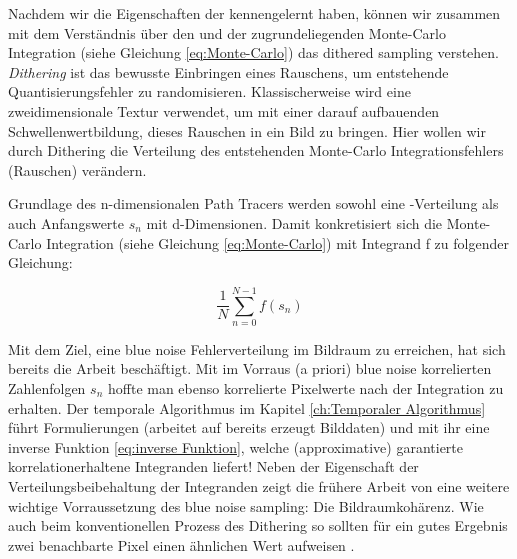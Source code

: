 \label{subsec:dither sampling}
Nachdem wir die Eigenschaften der  kennengelernt haben,
können wir zusammen mit dem Verständnis über den  und der 
zugrundeliegenden Monte-Carlo Integration (siehe Gleichung \ref{eq:Monte-Carlo}) das \glqq dithered sampling\grqq{} verstehen.
\textit{Dithering} ist das bewusste Einbringen eines Rauschens, um entstehende Quantisierungsfehler zu randomisieren.
Klassischerweise wird eine zweidimensionale  Textur verwendet, um mit einer darauf aufbauenden Schwellenwertbildung,
dieses Rauschen in ein Bild zu bringen. Hier wollen wir durch Dithering die Verteilung des entstehenden Monte-Carlo Integrationsfehlers (Rauschen) verändern.\par
Grundlage des n-dimensionalen Path Tracers werden sowohl eine -Verteilung als auch Anfangswerte $s_{n}$ mit d-Dimensionen.
Damit konkretisiert sich die Monte-Carlo Integration (siehe Gleichung \ref{eq:Monte-Carlo}) mit Integrand f zu folgender Gleichung:

\begin{tcolorbox}[rightrule=3mm, rounded corners=east]
    \begin{equation}\label{eq:concreteMonteCarlo}
        \frac{1}{N}\sum_{n=0}^{N-1}f(s_{n})
    \end{equation}
\end{tcolorbox}


Mit dem Ziel, eine blue noise Fehlerverteilung im Bildraum zu erreichen, hat sich bereits die Arbeit \cite{georgiev2016blue} beschäftigt. 
Mit im Vorraus (\glqq a priori\grqq{}) blue noise korrelierten Zahlenfolgen $s_{n}$ hoffte man ebenso korrelierte Pixelwerte nach 
der Integration zu erhalten. Der temporale Algorithmus im Kapitel \ref{ch:Temporaler Algorithmus} führt 
Formulierungen (arbeitet auf bereits erzeugt Bilddaten) und mit ihr eine inverse Funktion \ref{eq:inverse Funktion}, welche (approximative) garantierte
korrelationerhaltene Integranden liefert! Neben der Eigenschaft der Verteilungsbeibehaltung der Integranden zeigt die frühere Arbeit von \cite[Seite 3]{hal02158423}
eine weitere wichtige Vorraussetzung des blue noise sampling: Die Bildraumkohärenz. Wie auch beim konventionellen Prozess des Dithering so sollten für ein gutes
Ergebnis zwei benachbarte Pixel einen ähnlichen Wert aufweisen \cite{3288}.




